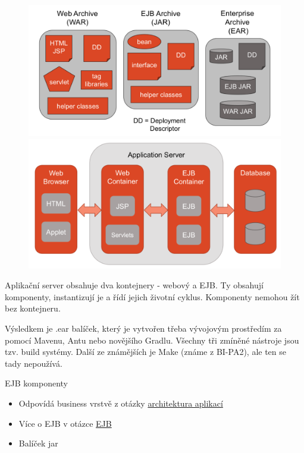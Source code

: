 \documentclass{szzclass}
\begin{document}
\begin{figure}[ht!]
\centering
\begin{minipage}{.5\textwidth}
  \centering
  \includegraphics[width=.75\linewidth]{topics/bi-wsi-si-29/images/image1}
\end{minipage}%
\begin{minipage}{.5\textwidth}
  \centering
  \includegraphics[width=.75\linewidth]{topics/bi-wsi-si-29/images/image2}
\end{minipage}
\end{figure}

Aplikační server obsahuje dva kontejnery - webový a EJB. Ty obsahují komponenty, instantizují je a řídí jejich životní cyklus. Komponenty nemohou žít bez kontejneru.

Výsledkem je .ear balíček, který je vytvořen třeba vývojovým prostředím za pomocí Mavenu, Antu nebo novějšího Gradlu. Všechny tři zmíněné nástroje jsou tzv. build systémy. Další ze známějších je Make (známe z BI-PA2), ale ten se tady nepoužívá.

EJB komponenty
\begin{itemize}
\item Odpovídá business vrstvě z otázky \href{https://docs.google.com/document/d/1OU75LDsImR4cEsQoyfGNyibG5ECJhGRKCfJqrUlpl1Q/edit?usp=sharing}{architektura aplikací}
\item Více o EJB v otázce \href{https://docs.google.com/document/d/1_yV6LyQ3dHi9VSOQhmPtGe9QXRESZDfxDK_NA9gJ1dY/edit?usp=sharing}{EJB}
\item Balíček jar
\end{itemize}
\end{document}
